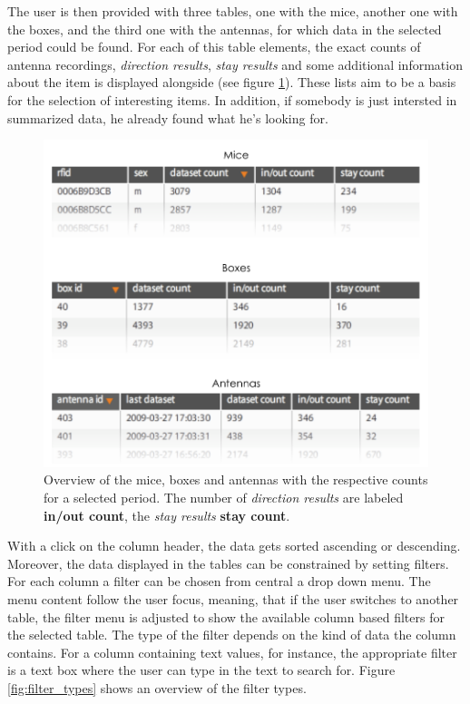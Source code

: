 The user is then provided with three tables, one with the mice, another one with the boxes, and the third one with the antennas, for which data in the selected period could be found. For each of this table elements, the exact counts of antenna recordings, \textit{direction results}, \textit{stay results} and some additional information about the item is displayed alongside (see figure \ref{fig:data_overview_with_count}). These lists aim to be a basis for the selection of interesting items. In addition, if somebody is just intersted in summarized data, he already found what he's looking for. 

\begin{figure}[htpb]
\begin{center}
  \includegraphics[width=.75\textwidth]{assets/pdf/overview_list.pdf}
  \caption[Overview of the summarized data for mice, boxes and antennas within a date period]{Overview of the mice, boxes and antennas with the respective counts for a selected period. The number of \textit{direction results} are labeled \textbf{in/out count}, the \textit{stay results}  \textbf{stay count}.}
  \label{fig:data_overview_with_count}
\end{center}
\end{figure}

With a click on the column header, the data gets sorted ascending or descending. Moreover, the data displayed in the tables can be constrained by setting filters. For each column a filter can be chosen from central a drop down menu. The menu content follow the user focus, meaning, that if the user switches to another table, the filter menu is adjusted to show the available column based filters for the selected table. The type of the filter depends on the kind of data the column contains. For a column containing text values, for instance, the appropriate filter is a text box where the user can type in the text to search for. Figure \ref{fig:filter_types} shows an overview of the filter types.


